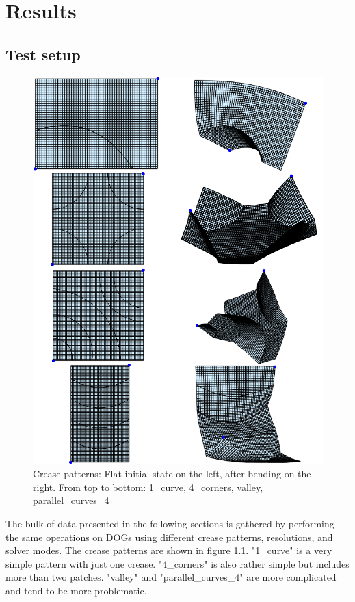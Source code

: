 \documentclass[a4paper,twoside,12pt,nochapterprefix]{scrbook}
\begin{document}
\chapter{Results}\label{sec:results}
\section{Test setup}
\begin{figure}
    \centering
    \includegraphics[width=0.9\linewidth]{figures/0308_creasepatterns_results}
    \caption{Crease patterns: Flat initial state on the left, after bending on the right. From top to bottom: 1\_curve, 4\_corners, valley, parallel\_curves\_4}
    \label{fig:creasepatterns}
\end{figure}
The bulk of data presented in the following sections is gathered by performing the same operations on DOGs using different crease patterns, resolutions, and solver modes. The crease patterns are shown in figure \ref{fig:creasepatterns}. "1\_curve" is a very simple pattern with just one crease. "4\_corners" is also rather simple but includes more than two patches. "valley" and "parallel\_curves\_4" are more complicated and tend to be more problematic.\newline
\end{document}
